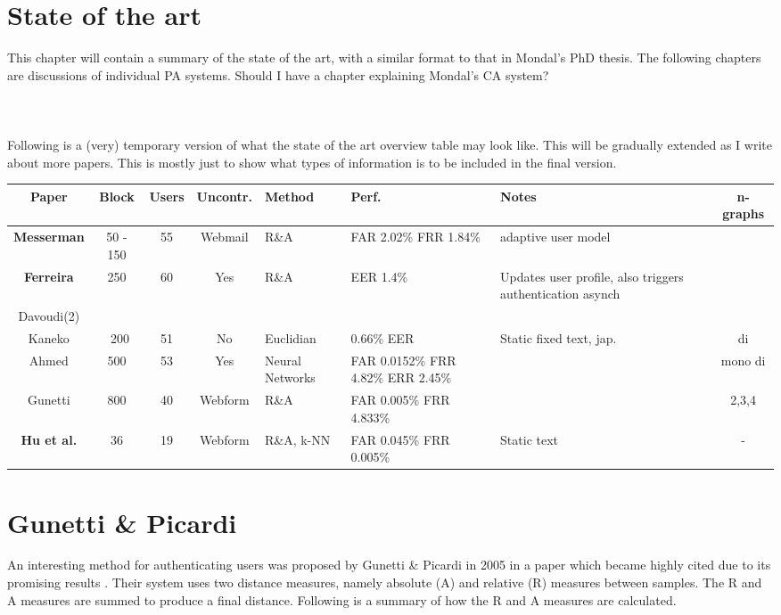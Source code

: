 \documentclass[informationsecurity]{gucmasterproject}
\begin{document}
\chapter{State of the art}
This chapter will contain a summary of the state of the art, with a similar format to that in Mondal's PhD thesis.
The following chapters are discussions of individual PA systems.
Should I have a chapter explaining Mondal's CA system?
\\\\\\\\
Following is a (very) temporary version of what the state of the art overview table may look like.
This will be gradually extended as I write about more papers.
This is mostly just to show what types of information is to be included in the final version.
\begin{table}[h]
\begin{tabular}{ |c|c|c|c|p{1.5cm}|p{1.9cm}|p{2cm}|c| } 
 \hline
 \bf Paper & \bf Block & \bf Users & \bf Uncontr. & \bf Method & \bf Perf. & \bf Notes & n-graphs\\ \hline
 \bf Messerman & 50 - 150 & 55 & Webmail & R\&A &  FAR 2.02\% FRR 1.84\% & adaptive user model & \\ \hline
 \bf Ferreira & 250 & 60 & Yes & R\&A & EER 1.4\% & Updates user profile, also triggers authentication asynch & \\ \hline
 Davoudi(2) & & & & & & & \\ \hline
 Kaneko & ~200 & 51 & No & Euclidian & 0.66\% EER & Static fixed text, jap. & di \\ \hline
 Ahmed & 500 & 53 & Yes & Neural Networks & FAR 0.0152\% FRR 4.82\% ERR 2.45\% & & mono di\\\hline
 Gunetti & 800 & 40 & Webform & R\&A & FAR 0.005\% FRR 4.833\% & & 2,3,4\\ \hline
 \bf Hu et al. & 36 & 19 & Webform & R\&A, k-NN & FAR 0.045\% FRR 0.005\% & Static text & - \\ \hline
 
\end{tabular}
\end{table}


\chapter{Gunetti \& Picardi}
\label{chap:gnp}
An interesting method for authenticating users was proposed by Gunetti \& Picardi in 2005 in a paper which became highly cited due to its promising results \cite{gnp}.
Their system uses two distance measures, namely absolute (A) and relative (R) measures between samples.
The R and A measures are summed to produce a final distance.
Following is a summary of how the R and A measures are calculated.
\end{document}
